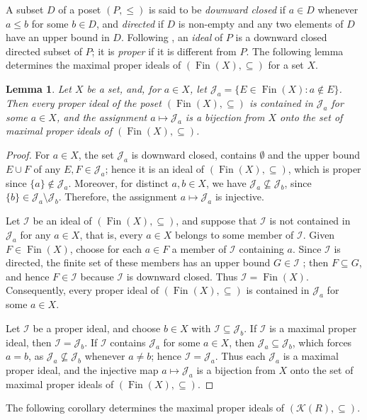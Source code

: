 \documentclass[12pt,reqno,a4paper]{amsart}
\newcommand{\K}{\mathcal{K}}
\DeclareMathOperator{\Fin}{Fin}
\theoremstyle{plain}
\newtheorem{lemma}[theorem]{Lemma}
\theoremstyle{definition}
\begin{document}
A subset $D$ of a poset $(P,\leq)$ is said to be \emph{downward closed} if $a\in D$ whenever $a\leq b$ for some $b\in D$, and \emph{directed} if $D$ is non-empty and any two elements of $D$ have an upper bound in $D$. Following \cite[Definition~5.1.45]{GoubaultLarrecq}, an \emph{ideal} of $P$ is a downward closed directed subset of $P$; it is \emph{proper} if it is different from $P$. The following lemma determines the maximal proper ideals of $(\Fin(X),\subseteq)$ for a set $X$.

\begin{lemma}\label{lem:max-ideals}
Let $X$ be a set, and, for $a\in X$, let $\mathcal{J}_a=\{E\in\Fin(X):a\notin E\}$. Then every proper ideal of the poset $(\Fin(X),\subseteq)$ is contained in $\mathcal{J}_a$ for some $a\in X$, and the assignment $a\mapsto\mathcal{J}_a$ is a bijection from $X$ onto the set of maximal proper ideals of $(\Fin(X),\subseteq)$.
\end{lemma}

\begin{proof}
For $a\in X$, the set $\mathcal{J}_a$ is downward closed, contains $\emptyset$ and the upper bound $E\cup F$ of any $E,F\in\mathcal{J}_a$; hence it is an ideal of $(\Fin(X),\subseteq)$, which is proper since $\{a\}\notin\mathcal{J}_a$. Moreover, for distinct $a,b\in X$, we have $\mathcal{J}_a\not\subseteq\mathcal{J}_b$, since $\{b\}\in\mathcal{J}_a\setminus\mathcal{J}_b$. Therefore, the assignment $a\mapsto\mathcal{J}_a$ is injective. 

Let $\mathcal{I}$ be an ideal of $(\Fin(X),\subseteq)$, and suppose that $\mathcal{I}$ is not contained in $\mathcal{J}_a$ for any $a\in X$, that is, every $a\in X$ belongs to some member of $\mathcal{I}$. Given $F\in\Fin(X)$, choose for each $a\in F$ a member of $\mathcal{I}$ containing $a$. Since $\mathcal{I}$ is directed, the finite set of these members has an upper bound $G\in\mathcal{I}$ \cite[p.~59]{GoubaultLarrecq}; then $F\subseteq G$, and hence $F\in\mathcal{I}$ because $\mathcal{I}$ is downward closed. Thus $\mathcal{I}=\Fin(X)$. Consequently, every proper ideal of $(\Fin(X),\subseteq)$ is contained in $\mathcal{J}_a$ for some $a\in X$.

Let $\mathcal{I}$ be a proper ideal, and choose $b\in X$ with $\mathcal{I}\subseteq\mathcal{J}_b$. If $\mathcal{I}$ is a maximal proper ideal, then $\mathcal{I}=\mathcal{J}_b$. If $\mathcal{I}$ contains $\mathcal{J}_a$ for some $a\in X$, then $\mathcal{J}_a\subseteq\mathcal{J}_b$, which forces $a=b$, as $\mathcal{J}_a\not\subseteq\mathcal{J}_b$ whenever $a\neq b$; hence $\mathcal{I}=\mathcal{J}_a$. Thus each $\mathcal{J}_a$ is a maximal proper ideal, and the injective map $a\mapsto\mathcal{J}_a$ is a bijection from $X$ onto the set of maximal proper ideals of $(\Fin(X),\subseteq)$.
\end{proof}
The following corollary determines the maximal proper ideals of $(\K(R),\subseteq)$.
\end{document}
